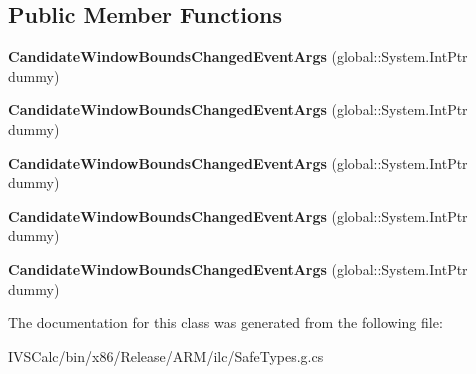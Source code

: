 \subsection*{Public Member Functions}
\begin{DoxyCompactItemize}
\item 
\mbox{\label{class_windows_1_1_u_i_1_1_xaml_1_1_controls_1_1_candidate_window_bounds_changed_event_args_a6217b4eefa5d311cff3af71497a54936}} 
{\bfseries Candidate\+Window\+Bounds\+Changed\+Event\+Args} (global\+::\+System.\+Int\+Ptr dummy)
\item 
\mbox{\label{class_windows_1_1_u_i_1_1_xaml_1_1_controls_1_1_candidate_window_bounds_changed_event_args_a6217b4eefa5d311cff3af71497a54936}} 
{\bfseries Candidate\+Window\+Bounds\+Changed\+Event\+Args} (global\+::\+System.\+Int\+Ptr dummy)
\item 
\mbox{\label{class_windows_1_1_u_i_1_1_xaml_1_1_controls_1_1_candidate_window_bounds_changed_event_args_a6217b4eefa5d311cff3af71497a54936}} 
{\bfseries Candidate\+Window\+Bounds\+Changed\+Event\+Args} (global\+::\+System.\+Int\+Ptr dummy)
\item 
\mbox{\label{class_windows_1_1_u_i_1_1_xaml_1_1_controls_1_1_candidate_window_bounds_changed_event_args_a6217b4eefa5d311cff3af71497a54936}} 
{\bfseries Candidate\+Window\+Bounds\+Changed\+Event\+Args} (global\+::\+System.\+Int\+Ptr dummy)
\item 
\mbox{\label{class_windows_1_1_u_i_1_1_xaml_1_1_controls_1_1_candidate_window_bounds_changed_event_args_a6217b4eefa5d311cff3af71497a54936}} 
{\bfseries Candidate\+Window\+Bounds\+Changed\+Event\+Args} (global\+::\+System.\+Int\+Ptr dummy)
\end{DoxyCompactItemize}


The documentation for this class was generated from the following file\+:\begin{DoxyCompactItemize}
\item 
I\+V\+S\+Calc/bin/x86/\+Release/\+A\+R\+M/ilc/Safe\+Types.\+g.\+cs\end{DoxyCompactItemize}
